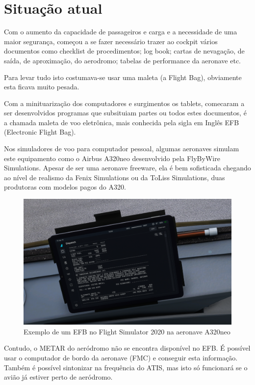 \chapter{Situação atual}
Com o aumento da capacidade de passageiros e carga e a 
necessidade de uma maior 
segurança, começou a se fazer necessário trazer ao cockpit vários
documentos como checklist de procedimentos; log book; cartas de 
nevagação, de saída, de aproximação, do aerodromo; tabelas de 
performance da aeronave etc. 

Para levar tudo isto costumava-se usar uma maleta (a Flight Bag),
obviamente esta ficava muito pesada.

Com a minituarização dos computadores e surgimentos os tablets, 
comecaram a ser desenvolvidos programas que subsituiam partes
ou todos estes documentos, é a chamada maleta de voo eletrônica,
mais conhecida pela sigla em Inglês EFB (Electronic Flight Bag).

Nos simuladores de voo para computador pessoal, algumas aeronaves
simulam este equipamento como o Airbus A320neo desenvolvido pela
FlyByWire Simulations. Apesar de ser uma aeronave freeware, ela 
é bem sofisticada chegando ao nível de realismo da Fenix Simulations
ou da ToLiss Simulations, duas produtoras com modelos pagos do A320.

\begin{figure}[ht]
    \begin{center}
    \includegraphics[width=400pt]{img/efb-a320.png}
    \caption{Exemplo de um EFB no Flight Simulator 2020 na aeronave A320neo}
    \label{fig:efb-a320}
    \end{center}
\end{figure}

Contudo, o METAR do aeródromo não se encontra disponível no EFB.
É possível usar o computador de bordo da aeronave (FMC) e conseguir
esta informação. Também é possível sintonizar na frequência do ATIS,
mas isto só funcionará se o avião já estiver perto de aeródromo.

